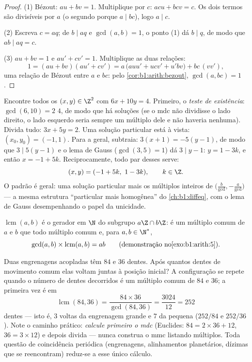 \begin{proof}
(1) Bézout: $au + bv = 1$. Multiplique por $c$: $acu + bcv = c$. Os dois
termos são divisíveis por $a$ (o segundo porque $a \mid bc$), logo $a
\mid c$.

(2) Escreva $c = aq$; de $b \mid aq$ e $\gcd(a, b) = 1$, o ponto (1)
dá $b \mid q$, de modo que $ab \mid aq = c$.

(3) $au + bv = 1$ e $au' + cv' = 1$. Multiplique as duas
relações:
\[
1 = (au + bv)(au' + cv')
= a\,\bigl(auu' + ucv' + u'bv\bigr) + bc\,(vv') ,
\]
uma relação de Bézout entre $a$ e $bc$: pelo
\cref{cor:b1:arith:bezout}, $\gcd(a, bc) = 1$.
\end{proof}

\begin{example}\label{ex:b1:arith:diophantine}
Encontre todos os $(x, y) \in \Z^2$ com $6x + 10y = 4$. Primeiro, o
\emph{teste de existência}: $\gcd(6, 10) = 2$  $4$, de modo que há
soluções (se o mdc não dividisse o lado direito, o lado esquerdo
seria sempre um múltiplo dele e não haveria nenhuma). Divida
tudo: $3x + 5y = 2$. Uma solução particular está à vista: $(x_0,
y_0) = (-1, 1)$. Para a geral, subtraia: $3(x + 1) = -5(y -
1)$, de modo que $3 \mid 5(y-1)$ e o lema de Gauss ($\gcd(3,5) = 1$) dá
$3 \mid y - 1$: $y = 1 - 3k$, e então $x = -1 + 5k$. Reciprocamente, todo
par desses serve:
\[
(x, y) = (-1 + 5k,\ 1 - 3k), \qquad k \in \Z .
\]
O padrão é geral: uma solução particular mais os múltiplos inteiros
de $\bigl(\frac b{\gcd}, -\frac a{\gcd}\bigr)$ --- a mesma estrutura
``particular mais homogênea'' do \cref{ch:b1:diffeq}, com o lema de Gauss
desempenhando o papel da unicidade.
\end{example}

\begin{definition}\label{def:b1:arith:lcm}
$\operatorname{lcm}(a, b)$ é o
gerador em $\N$ do subgrupo $a\Z \cap b\Z$: é um múltiplo comum de $a$ e
$b$ que  todo múltiplo comum e, para $a, b \in \N^*$,
\[
\gcd(a,b) \times \operatorname{lcm}(a,b) = ab
\qquad (\text{demonstração no} \cref{exo:b1:arith:5}).
\]
\end{definition}

\begin{example}\label{ex:b1:arith:gears}
Duas engrenagens acopladas têm $84$ e $36$ dentes. Após quantos dentes
de movimento comum elas voltam juntas à posição inicial?
A configuração se repete quando o número de dentes decorridos é um
múltiplo comum de $84$ e $36$; a primeira vez é em
\[
\operatorname{lcm}(84, 36) = \frac{84 \times 36}{\gcd(84, 36)}
= \frac{3024}{12} = 252
\]
dentes --- isto é, $3$ voltas da engrenagem grande e $7$ da
pequena ($252/84$ e $252/36$). Note o caminho prático:
\emph{calcule primeiro o mdc} (Euclides: $84 = 2\times36 + 12$, $36
= 3\times12$) e depois divida --- nunca construa o mmc listando
múltiplos. Toda questão de coincidência periódica (engrenagens,
alinhamentos planetários, dízimas que se reencontram) reduz-se a esse
único cálculo.
\end{example}

